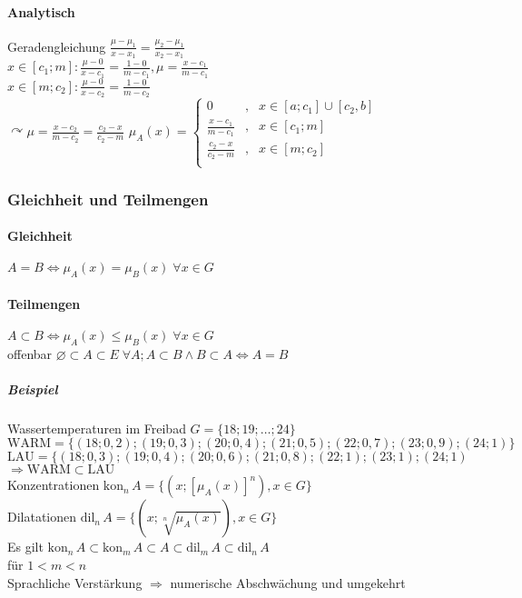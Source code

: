 \documentclass[a4paper]{scrartcl}
\begin{document}
\paragraph{Analytisch}
Geradengleichung $ \frac{\mu-\mu_1}{x-x_1} = \frac{\mu_2-\mu_1}{x_2 -x_1}$ \\
$x \in [c_1; m] : \frac{\mu-0}{x-c_1} = \frac{1-0}{m-c_1}, \mu = \frac{x-c_1}{m-c_1}$\\
$x\in [m;c_2] : \frac{\mu-0}{x-c_2} = \frac{1-0}{m-c_2}$\\
$\curvearrowright \mu = \frac{x-c_2}{m-c_2} = \frac{c_2 -x}{c_2 - m}$
$\mu_A(x)  = \left\{ \begin{array}{ccc} 0 & , & x \in [a;c_1] \cup [c_2,b] \\ \frac{x-c_1}{m-c_1} & , & x \in [c_1;m]\\ \frac{c_2-x}{c_2-m} & , & x \in [m;c_2] \\ \end{array} \right.$

\subsubsection{Gleichheit und Teilmengen}
\paragraph{Gleichheit} $A=B \Leftrightarrow \mu_A (x) = \mu_B (x) \; \forall x \in G$
\paragraph{Teilmengen} $A \subset B \Leftrightarrow \mu_A (x) \leq \mu_B (x) \; \forall x \in G$\\
offenbar $\varnothing \subset A \subset E \; \forall A; A \subset B \wedge B \subset A \Leftrightarrow A = B$

\subparagraph{Beispiel} Wassertemperaturen im Freibad
$G =\{ 18;19;\dots;24 \}$\\
$\text{WARM} = \{ (18;0,2);(19;0,3);(20;0,4);(21;0,5);(22;0,7);(23;0,9);(24;1) \}$\\
$\text{LAU} = \{(18;0,3);(19;0,4);(20;0,6);(21;0,8);(22;1);(23;1);(24;1)$
$\Rightarrow \text{WARM} \subset \text{LAU}$\\
Konzentrationen $\text{kon}_n \,A = \{ (x ; [\mu_A (x)]^n),x\in G\}$\\
Dilatationen $\text{dil}_n \,A = \{(x; \sqrt[n]{\mu_A (x)}), x \in G\}$\\
Es gilt $\text{kon}_n \, A \subset \text{kon}_m \, A \subset A \subset \text{dil}_m \, A \subset \text{dil}_n \, A$\\
für $1 < m < n$\\
Sprachliche Verstärkung $\Rightarrow$ numerische Abschwächung und umgekehrt
\end{document}
